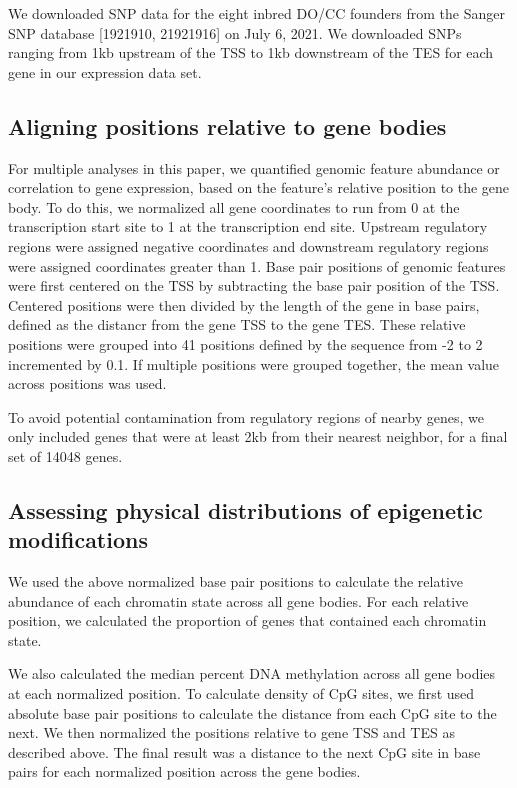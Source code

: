 \documentclass[10pt,letterpaper]{article}
\begin{document}
We downloaded SNP data for the eight inbred DO/CC founders from the
Sanger SNP database {[}1921910, 21921916{]} on July 6, 2021. We
downloaded SNPs ranging from 1kb upstream of the TSS to 1kb downstream
of the TES for each gene in our expression data set.

\hypertarget{aligning-positions-relative-to-gene-bodies}{%
\subsection{Aligning positions relative to gene
bodies}\label{aligning-positions-relative-to-gene-bodies}}

For multiple analyses in this paper, we quantified genomic feature
abundance or correlation to gene expression, based on the feature's
relative position to the gene body. To do this, we normalized all gene
coordinates to run from 0 at the transcription start site to 1 at the
transcription end site. Upstream regulatory regions were assigned
negative coordinates and downstream regulatory regions were assigned
coordinates greater than 1. Base pair positions of genomic features were
first centered on the TSS by subtracting the base pair position of the
TSS. Centered positions were then divided by the length of the gene in
base pairs, defined as the distancr from the gene TSS to the gene TES.
These relative positions were grouped into 41 positions defined by the
sequence from -2 to 2 incremented by 0.1. If multiple positions were
grouped together, the mean value across positions was used.

To avoid potential contamination from regulatory regions of nearby
genes, we only included genes that were at least 2kb from their nearest
neighbor, for a final set of 14048 genes.

\hypertarget{assessing-physical-distributions-of-epigenetic-modifications}{%
\subsection{Assessing physical distributions of epigenetic
modifications}\label{assessing-physical-distributions-of-epigenetic-modifications}}

We used the above normalized base pair positions to calculate the
relative abundance of each chromatin state across all gene bodies. For
each relative position, we calculated the proportion of genes that
contained each chromatin state.

We also calculated the median percent DNA methylation across all gene
bodies at each normalized position. To calculate density of CpG sites,
we first used absolute base pair positions to calculate the distance
from each CpG site to the next. We then normalized the positions
relative to gene TSS and TES as described above. The final result was a
distance to the next CpG site in base pairs for each normalized position
across the gene bodies.
\end{document}
